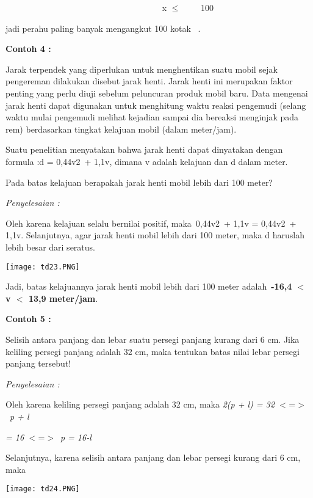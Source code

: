 \documentclass[11pt,fleqn]{book} %
\begin{document}
\noindent ~~~~~~~~~~~~~~~~~~~~~~~~~~~~~~~~~~~~ x $\mathrm{\le}$~~~~ 100

\noindent jadi perahu paling banyak mengangkut 100 kotak~ .~~~~~~

\noindent \textbf{Contoh 4 :}

\noindent Jarak terpendek yang diperlukan untuk menghentikan suatu mobil sejak pengereman dilakukan disebut jarak henti. Jarak henti ini merupakan faktor penting yang perlu diuji sebelum peluncuran produk mobil baru. Data mengenai jarak henti dapat digunakan untuk menghitung waktu reaksi pengemudi (selang waktu mulai pengemudi melihat kejadian sampai dia bereaksi menginjak pada rem) berdasarkan tingkat kelajuan mobil (dalam meter/jam).

\noindent Suatu penelitian menyatakan bahwa jarak henti dapat dinyatakan dengan formula :d = {\textbar}0,44v2~+ 1,1v{\textbar}, dimana v adalah kelajuan dan d dalam meter.

\noindent Pada batas kelajuan berapakah jarak henti mobil lebih dari 100 meter?

\noindent \textit{Penyelesaian :}

\noindent Oleh karena kelajuan selalu bernilai positif, maka~{\textbar}0,44v2~+ 1,1v{\textbar} = 0,44v2~+ 1,1v. Selanjutnya, agar jarak henti mobil lebih dari 100 meter, maka d haruslah lebih besar dari seratus.

\noindent \texttt{[image: td23.PNG]}\textbf{}

\noindent Jadi, batas kelajuannya jarak henti mobil lebih dari 100 meter adalah~\textbf{-16,4 $\boldsymbol{<}$ v $\boldsymbol{<}$ 13,9 meter/jam}.

\noindent \textbf{Contoh 5 :}

\noindent Selisih antara panjang dan lebar suatu persegi panjang kurang dari 6 cm. Jika keliling persegi panjang adalah 32 cm, maka tentukan batas nilai lebar persegi panjang tersebut!

\noindent \textit{Penyelesaian :}

\noindent Oleh karena keliling persegi panjang adalah 32 cm, maka \textit{2(p + l) = 32} $<$=$>$~\textit{p + l }

\noindent \textit{= 16} $<$=$>$~\textit{p = 16-l}

\noindent Selanjutnya, karena selisih antara panjang dan lebar persegi kurang dari 6 cm, maka

\noindent \texttt{[image: td24.PNG]}
\end{document}
